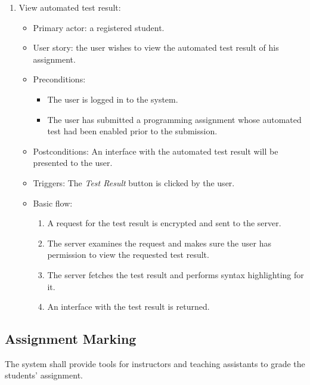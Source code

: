 \begin{enumerate}
\item View automated test result:
\begin{itemize}
    \item Primary actor: a registered student.
    \item User story: the user wishes to view the automated test result of his
        assignment.
    \item Preconditions:
        \begin{itemize}
            \item The user is logged in to the system.
            \item The user has submitted a programming assignment whose
                automated test had been enabled prior to the submission.
        \end{itemize}
    \item Postconditions:
        An interface with the automated test result will be presented to the
        user.
    \item Triggers: 
        The \emph{Test Result} button is clicked by the user.
    \item Basic flow:
        \begin{enumerate}
            \item A request for the test result is encrypted and sent to the
                server.
            \item The server examines the request and makes sure the user has
                permission to view the requested test result.
            \item The server fetches the test result and performs syntax
                highlighting for it.
            \item An interface with the test result is returned.
        \end{enumerate}
\end{itemize}
\end{enumerate}

\subsection{Assignment Marking}
The system shall provide tools for instructors and teaching assistants to grade
the students' assignment.

